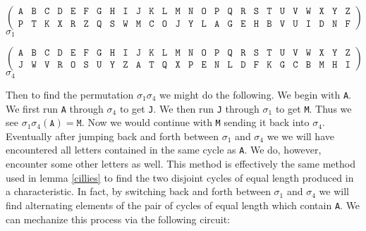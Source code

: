 \begin{center}
	\[
		\left(
		\begin{array}{llllllllllllllllllllllllll}
				\texttt{A} & \texttt{B} & \texttt{C} & \texttt{D} &
				\texttt{E} & \texttt{F} & \texttt{G} & \texttt{H} &
				\texttt{I} & \texttt{J} & \texttt{K} & \texttt{L} &
				\texttt{M} & \texttt{N} & \texttt{O} & \texttt{P} &
				\texttt{Q} & \texttt{R} & \texttt{S} & \texttt{T} &
				\texttt{U} & \texttt{V} & \texttt{W} & \texttt{X} &
				\texttt{Y} & \texttt{Z}                             \\
				\texttt{P} & \texttt{T} & \texttt{K} & \texttt{X} &
				\texttt{R} & \texttt{Z} & \texttt{Q} & \texttt{S} &
				\texttt{W} & \texttt{M} & \texttt{C} & \texttt{O} &
				\texttt{J} & \texttt{Y} & \texttt{L} & \texttt{A} &
				\texttt{G} & \texttt{E} & \texttt{H} & \texttt{B} &
				\texttt{V} & \texttt{U} & \texttt{I} & \texttt{D} &
				\texttt{N} & \texttt{F}
			\end{array}
		\right)
	\]
	$\sigma_1$
\end{center}
\begin{center}
	\[
		\left(
		\begin{array}{llllllllllllllllllllllllll}
				\texttt{A} & \texttt{B} & \texttt{C} & \texttt{D} &
				\texttt{E} & \texttt{F} & \texttt{G} & \texttt{H} &
				\texttt{I} & \texttt{J} & \texttt{K} & \texttt{L} &
				\texttt{M} & \texttt{N} & \texttt{O} & \texttt{P} &
				\texttt{Q} & \texttt{R} & \texttt{S} & \texttt{T} &
				\texttt{U} & \texttt{V} & \texttt{W} & \texttt{X} &
				\texttt{Y} & \texttt{Z}                             \\
				\texttt{J} & \texttt{W} & \texttt{V} & \texttt{R} &
				\texttt{O} & \texttt{S} & \texttt{U} & \texttt{Y} &
				\texttt{Z} & \texttt{A} & \texttt{T} & \texttt{Q} &
				\texttt{X} & \texttt{P} & \texttt{E} & \texttt{N} &
				\texttt{L} & \texttt{D} & \texttt{F} & \texttt{K} &
				\texttt{G} & \texttt{C} & \texttt{B} & \texttt{M} &
				\texttt{H} & \texttt{I}
			\end{array}
		\right)
	\]
	$\sigma_4$
\end{center}
Then to find the permutation $\sigma_1\sigma_4$ we might do the following. We begin with \texttt{A}. We first run \texttt{A} through $\sigma_4$ to get \texttt{J}. We then run \texttt{J} through $\sigma_1$ to get \texttt{M}. Thus we see $\sigma_1\sigma_4(\texttt{A}) = \texttt{M}$. Now we would continue with \texttt{M} sending it back into $\sigma_4$. Eventually after jumping back and forth between $\sigma_1$ and $\sigma_4$ we we will have encountered all letters contained in the same cycle as \texttt{A}. We do, however, encounter some other letters as well. This method is effectively the same method used in lemma \ref{cillies} to find the two disjoint cycles of equal length produced in a characteristic. In fact, by switching back and forth between $\sigma_1$ and $\sigma_4$ we will find alternating elements of the pair of cycles of equal length which contain \texttt{A}. We can mechanize this process via the following circuit:

